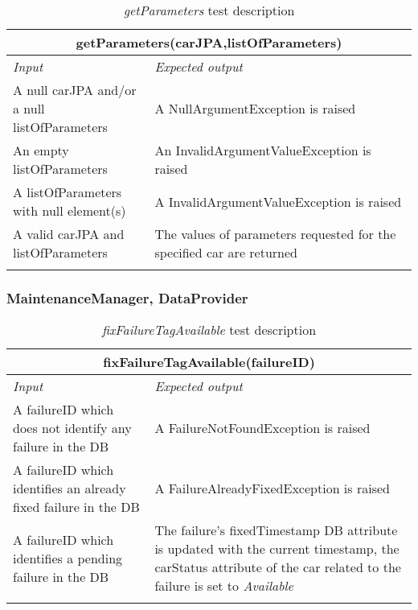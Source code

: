 \begin{longtable}{p{0.35\linewidth}p{0.65\linewidth}}
\multicolumn{2}{c}{\textbf{getParameters(carJPA,listOfParameters)}} \\
\toprule
\emph{Input} & \emph{Expected output} \\
\midrule
A null carJPA and/or a null listOfParameters & A NullArgumentException is raised\\
\midrule
An empty listOfParameters & An InvalidArgumentValueException is raised \\
\midrule
A listOfParameters with null element(s) & A InvalidArgumentValueException is raised\\
\midrule
A valid carJPA and listOfParameters & The values of parameters requested for the specified car are returned \\
\bottomrule
\caption{\emph{getParameters} test description}
\end{longtable}

\clearpage

\subsubsection{MaintenanceManager, DataProvider}

\begin{longtable}{p{0.35\linewidth}p{0.65\linewidth}}
\multicolumn{2}{c}{\textbf{fixFailureTagAvailable(failureID)}} \\
\toprule
\emph{Input} & \emph{Expected output} \\
\midrule
A failureID which does not identify any failure in the DB & A FailureNotFoundException is raised\\
\midrule
A failureID which identifies an already fixed failure in the DB & A FailureAlreadyFixedException is raised\\
\midrule
A failureID which identifies a pending failure in the DB & The failure's fixedTimestamp DB attribute is updated with the current timestamp, the carStatus attribute of the car related to the failure is set to \emph{Available}\\
\bottomrule
\caption{\emph{fixFailureTagAvailable} test description}
\end{longtable}


